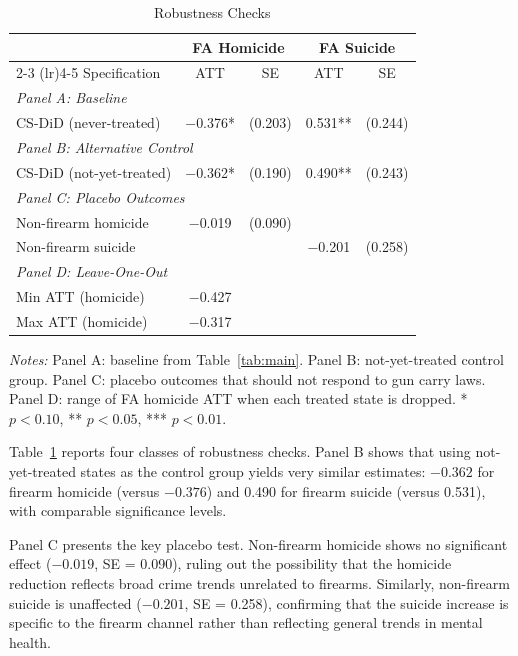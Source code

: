 \documentclass[12pt]{article}
\begin{document}
\begin{table}[H]
\centering
\caption{Robustness Checks}
\begin{threeparttable}
\begin{tabular}{lcccc}
\toprule
& \multicolumn{2}{c}{FA Homicide} & \multicolumn{2}{c}{FA Suicide} \\
\cmidrule(lr){2-3} \cmidrule(lr){4-5}
Specification & ATT & SE & ATT & SE \\
\midrule
\multicolumn{5}{l}{\textit{Panel A: Baseline}} \\[3pt]
CS-DiD (never-treated) & $-$0.376* & (0.203) & 0.531** & (0.244) \\[6pt]
\multicolumn{5}{l}{\textit{Panel B: Alternative Control}} \\[3pt]
CS-DiD (not-yet-treated) & $-$0.362* & (0.190) & 0.490** & (0.243) \\[6pt]
\multicolumn{5}{l}{\textit{Panel C: Placebo Outcomes}} \\[3pt]
Non-firearm homicide & $-$0.019 & (0.090) & & \\
Non-firearm suicide & & & $-$0.201 & (0.258) \\[6pt]
\multicolumn{5}{l}{\textit{Panel D: Leave-One-Out}} \\[3pt]
Min ATT (homicide) & $-$0.427 & & & \\
Max ATT (homicide) & $-$0.317 & & & \\
\bottomrule
\end{tabular}
\begin{tablenotes}[flushleft]
\small
\item \textit{Notes:} Panel A: baseline from Table~\ref{tab:main}. Panel B: not-yet-treated control group. Panel C: placebo outcomes that should not respond to gun carry laws. Panel D: range of FA homicide ATT when each treated state is dropped. * $p<0.10$, ** $p<0.05$, *** $p<0.01$.
\end{tablenotes}
\end{threeparttable}
\label{tab:robustness}
\end{table}

Table~\ref{tab:robustness} reports four classes of robustness checks. Panel B shows that using not-yet-treated states as the control group yields very similar estimates: $-0.362$ for firearm homicide (versus $-0.376$) and 0.490 for firearm suicide (versus 0.531), with comparable significance levels.

Panel C presents the key placebo test. Non-firearm homicide shows no significant effect ($-0.019$, SE = 0.090), ruling out the possibility that the homicide reduction reflects broad crime trends unrelated to firearms. Similarly, non-firearm suicide is unaffected ($-0.201$, SE = 0.258), confirming that the suicide increase is specific to the firearm channel rather than reflecting general trends in mental health.
\end{document}
